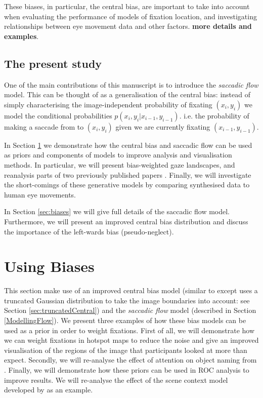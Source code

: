 \documentclass[a4paper, twocolumn, oneside, 10pt]{article}
\begin{document}
These biases, in particular, the central bias, are important to take into account when evaluating the performance of models of fixation location, and investigating relationships between eye movement data and other factors. \textbf{more details and examples}. 

\subsection{The present study}

One of the main contributions of this manuscript is to introduce the \textit{saccadic flow} model. This can be thought of as a generalisation of the central bias: instead of simply characterising the image-independent probability of fixating $(x_i, y_i)$ we model the conditional probabilities $p(x_i,y_i|x_{i-1}, y_{i-1})$. i.e. the probability of making a saccade from to $(x_i,y_i)$ given we are currently fixating $(x_{i-1}, y_{i-1})$.

In Section \ref{sec:usingbiaes} we demonstrate how the central bias and saccadic flow can be used as priors and components of models to improve analysis and visualisation methods. In particular, we will present bias-weighted gaze landscapes, and reanalysis parts of two previously published papers \citep{clarke2013,ehinger2009}. Finally, we will investigate the short-comings of these generative models by comparing synthesised data to human eye movements. 

In Section \ref{sec:biases} we will give full details of the saccadic flow model. Furthermore, we will present an improved central bias distribution and discuss the importance of the left-wards bias (pseudo-neglect).

\section{Using Biases}
\label{sec:usingbiaes}

This section make use of an improved central bias model (similar to \cite{clarke-tatler2014} except uses a truncated Gaussian distribution to take the image boundaries into account: see Section \ref{sec:truncatedCentral}) and the \textit{saccadic flow} model (described in Section \ref{ModellingFlow}). We present three examples of how these bias models can be used as a prior in order to weight fixations. First of all, we will demonstrate how we can weight fixations in hotspot maps to reduce the noise and give an improved visualisation of the regions of the image that participants looked at more than expect. Secondly, we will re-analyse the effect of attention on object naming from \cite{clarke2013}.  Finally, we will demonstrate how these priors can be used in ROC analysis to improve results. We will re-analyse the effect of the scene context model developed by  \cite{ehinger2009} as an example. 
\end{document}
